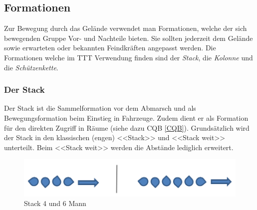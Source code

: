 \subsection{Formationen}
Zur Bewegung durch das Gelände verwendet man Formationen, welche der sich bewegenden Gruppe Vor- und Nachteile bieten. Sie sollten jederzeit dem Gelände sowie erwarteten oder bekannten Feindkräften angepasst werden. Die Formationen welche im TTT Verwendung finden sind der \textit{Stack}, die \textit{Kolonne} und die \textit{Schützenkette}. 

\subsubsection{Der Stack}
Der Stack ist die Sammelformation vor dem Abmarsch und als Bewegungsformation beim Einstieg in Fahrzeuge. Zudem dient er als Formation für den direkten Zugriff in Räume (siehe dazu CQB \autoref{CQB}). Grundsätzlich wird der Stack in den klassischen (engen) <<Stack>> und <<Stack weit>> unterteilt. Beim <<Stack weit>> werden die Abstände lediglich erweitert.\\
\begin{figure}[!htb]
	\centering
	\includegraphics[width=15cm]{./img/grundlagen/formationen/Stack.png}
	\caption{Stack 4 und 6 Mann}
\end{figure}

